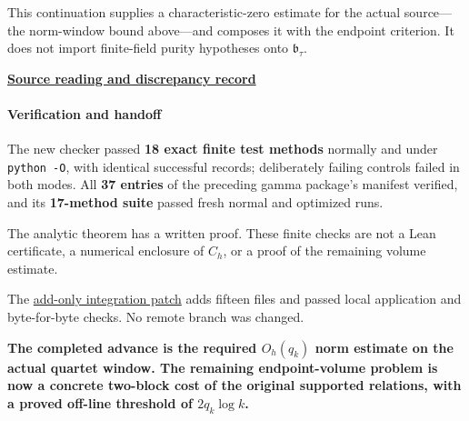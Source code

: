 This continuation supplies a characteristic-zero estimate for the actual source---the norm-window bound above---and composes it with the endpoint criterion. It does not import finite-field purity hypotheses onto \(\mathfrak b_\tau\).

\href{sources/web_arithmetic_endpoint_delivery/Tau_Arithmetic_Endpoint_Bounds/SOURCE_REVIEW.md}{\textbf{Source reading and discrepancy record}}

\paragraph{Verification and handoff}\label{endpoint-user_norm_original--verification-and-handoff}

The new checker passed \textbf{18 exact finite test methods} normally and under \texttt{python\ -O}, with identical successful records; deliberately failing controls failed in both modes. All \textbf{37 entries} of the preceding gamma package's manifest verified, and its \textbf{17-method suite} passed fresh normal and optimized runs.

The analytic theorem has a written proof. These finite checks are not a Lean certificate, a numerical enclosure of \(C_h\), or a proof of the remaining volume estimate.

The \href{sources/web_arithmetic_endpoint_delivery/Tau_Arithmetic_Endpoint_Bounds/INTEGRATION.patch}{add-only integration patch} adds fifteen files and passed local application and byte-for-byte checks. No remote branch was changed.

\textbf{The completed advance is the required \(O_h(q_k)\) norm estimate on the actual quartet window. The remaining endpoint-volume problem is now a concrete two-block cost of the original supported relations, with a proved off-line threshold of \(2q_k\log k\).}
